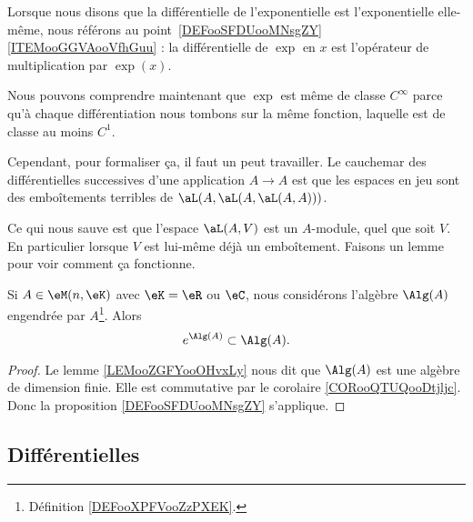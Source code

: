 \begin{normaltext}
	Lorsque nous disons que la différentielle de l'exponentielle est l'exponentielle elle-même, nous référons au point~\ref{DEFooSFDUooMNsgZY}\ref{ITEMooGGVAooVfhGuu} : la différentielle de \( \exp\) en \( x\) est l'opérateur de multiplication par \( \exp(x)\).

	Nous pouvons comprendre maintenant que \( \exp\) est même de classe \(  C^{\infty}\) parce qu'à chaque différentiation nous tombons sur la même fonction, laquelle est de classe au moins \( C^1\).

	Cependant, pour formaliser ça, il faut un peut travailler. Le cauchemar des différentielles successives d'une application \( A\to A\) est que les espaces en jeu sont des emboîtements terribles de \( \aL(A,\aL(A,\aL(A,A)))\).

	Ce qui nous sauve est que l'espace \( \aL(A,V)\) est un \( A\)-module, quel que soit \( V\). En particulier lorsque \( V\) est lui-même déjà un emboîtement. Faisons un lemme pour voir comment ça fonctionne.
\end{normaltext}


\begin{lemma}        \label{LEMooCEVGooFVXndZ}
	Si \( A\in \eM(n,\eK)\) avec \( \eK=\eR\) ou \( \eC\), nous considérons l'algèbre \( \Alg(A)\) engendrée par \( A\)\footnote{Définition \ref{DEFooXPFVooZzPXEK}.}. Alors
	\begin{equation}
		e^{\Alg(A)}\subset \Alg(A).
	\end{equation}
\end{lemma}

\begin{proof}
	Le lemme \ref{LEMooZGFYooOHvxLy} nous dit que \( \Alg(A)\) est une algèbre de dimension finie. Elle est commutative par le corolaire \ref{CORooQTUQooDtjljc}. Donc la proposition \ref{DEFooSFDUooMNsgZY} s'applique.
\end{proof}

\subsection{Différentielles}

